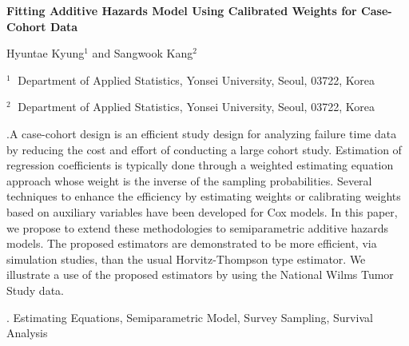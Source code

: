 \documentclass[12pt]{article}
\begin{document}
\begin{flushleft}


{\LARGE\bf Fitting Additive Hazards Model Using Calibrated Weights for Case-Cohort Data}


\vspace{1.0cm}

Hyuntae Kyung$^1$ and Sangwook Kang$^2$

\begin{description}

\item $^1 \;$ Department of Applied Statistics, Yonsei University, 
Seoul, 03722, Korea

\item $^2 \;$ Department of Applied Statistics, Yonsei University, 
Seoul, 03722, Korea

\end{description}

\end{flushleft}


\vspace{0.75cm}

.A case-cohort design is an efficient study design for analyzing failure time data by
reducing the cost and effort of conducting a large cohort study. 
Estimation of regression coefficients is typically done through a weighted estimating equation approach 
whose weight is the inverse of the sampling probabilities. Several techniques to enhance the efficiency
by estimating weights or calibrating weights based on auxiliary variables have been developed 
for Cox models. In this paper, we propose to extend these methodologies to semiparametric
additive hazards models. The proposed estimators are demonstrated to be more efficient, via simulation studies, than the usual Horvitz-Thompson type estimator.
We illustrate a use of the proposed estimators by using the National Wilms Tumor Study data.

\vskip 2mm

.
Estimating Equations, Semiparametric Model, Survey Sampling, Survival Analysis 
\end{document}
